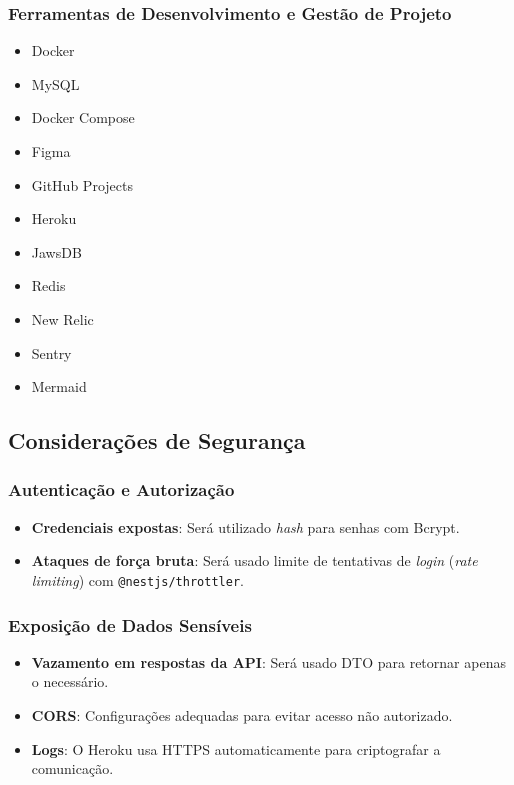 \documentclass[12pt, a4paper]{article}
\begin{document}
\begin{spacing}{1.5}
\subsubsection{Ferramentas de Desenvolvimento e Gestão de Projeto}
\begin{itemize}
    \item Docker
    \item MySQL
    \item Docker Compose
    \item Figma
    \item GitHub Projects
    \item Heroku
    \item JawsDB
    \item Redis
    \item New Relic
    \item Sentry
    \item Mermaid
\end{itemize}
\end{spacing}

\subsection{Considerações de Segurança}

\subsubsection{Autenticação e Autorização}
\begin{spacing}{1.5}
\begin{itemize}
    \item \textbf{Credenciais expostas}: Será utilizado \textit{hash} para senhas com Bcrypt.
    \item \textbf{Ataques de força bruta}: Será usado limite de tentativas de \textit{login} (\textit{rate limiting}) com \texttt{@nestjs/throttler}.
\end{itemize}
\end{spacing}

\subsubsection{Exposição de Dados Sensíveis}
\begin{spacing}{1.5}
\begin{itemize}
    \item \textbf{Vazamento em respostas da API}: Será usado DTO para retornar apenas o necessário.
    \item \textbf{CORS}: Configurações adequadas para evitar acesso não autorizado.
    \item \textbf{Logs}: O Heroku usa HTTPS automaticamente para criptografar a comunicação.
\end{itemize}
\end{spacing}
\end{document}
